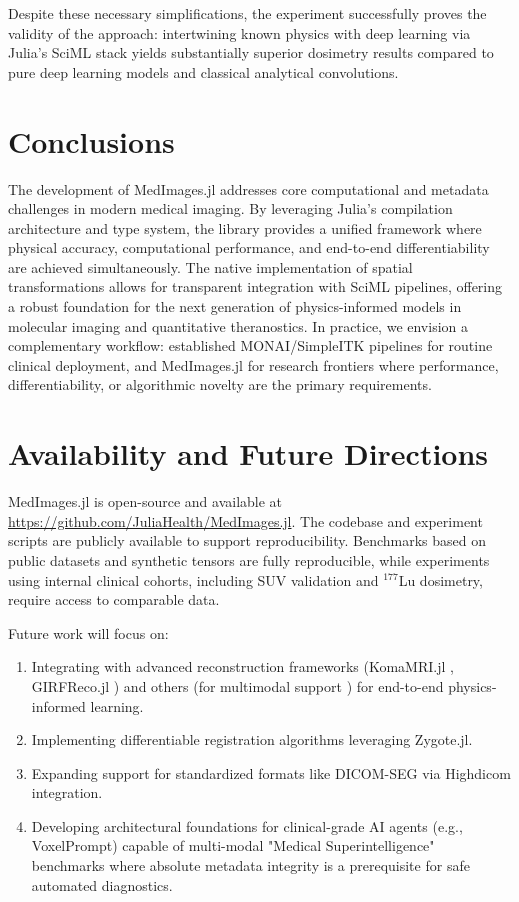 \documentclass[a4paper,10pt,preprint]{elsarticle}
\begin{document}
Despite these necessary simplifications, the experiment successfully proves the validity of the approach: intertwining known physics with deep learning via Julia's SciML stack yields substantially superior dosimetry results compared to pure deep learning models and classical analytical convolutions.


\section{Conclusions}
The development of MedImages.jl addresses core computational and metadata challenges in modern medical imaging. By leveraging Julia's compilation architecture and type system, the library provides a unified framework where physical accuracy, computational performance, and end-to-end differentiability are achieved simultaneously. The native implementation of spatial transformations allows for transparent integration with SciML pipelines, offering a robust foundation for the next generation of physics-informed models in molecular imaging and quantitative theranostics.
In practice, we envision a complementary workflow: established MONAI/SimpleITK pipelines for routine clinical deployment, and MedImages.jl for research frontiers where performance, differentiability, or algorithmic novelty are the primary requirements.

\section*{Availability and Future Directions}
MedImages.jl is open-source and available at \url{https://github.com/JuliaHealth/MedImages.jl}. The codebase and experiment scripts are publicly available to support reproducibility. Benchmarks based on public datasets and synthetic tensors are fully reproducible, while experiments using internal clinical cohorts, including SUV validation and \(^{177}\)Lu dosimetry, require access to comparable data.

Future work will focus on:
\begin{enumerate}
    \item Integrating with advanced reconstruction frameworks (KomaMRI.jl \cite{CastilloPassiCoronado2023}, GIRFReco.jl \cite{JaffrayWu2024})  and others (for multimodal support ) for end-to-end physics-informed learning.
    \item Implementing differentiable registration algorithms leveraging Zygote.jl.
    \item Expanding support for standardized formats like DICOM-SEG via Highdicom \cite{BridgeGorman2022} integration.
    \item Developing architectural foundations for clinical-grade AI agents (e.g., VoxelPrompt) capable of multi-modal "Medical Superintelligence" benchmarks where absolute metadata integrity is a prerequisite for safe automated diagnostics.
\end{enumerate}
\end{document}
